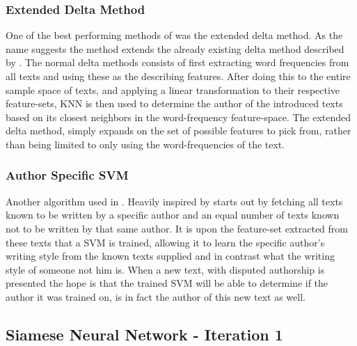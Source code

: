 \subsubsection{Extended Delta Method}

One of the best performing methods of \cite{US} was the extended delta method.
As the name suggests the method extends the already existing delta method
described by \cite{evert2015towards}. The normal delta methods consists of first
extracting word frequencies from all texts and using these as the describing
features. After doing this to the entire sample space of texts, and applying a
linear transformation to their respective feature-sets, \gls{KNN} is then used
to determine the author of the introduced texts based on its closest neighbors
in the word-frequency feature-space. The extended delta method, simply expands
on the set of possible features to pick from, rather than being limited to only
using the word-frequencies of the text.


\subsubsection{Author Specific SVM}

Another algorithm used in \cite{US}. Heavily inspired by \cite{hansen2014}
starts out by fetching all texts known to be written by a specific author and an
equal number of texts known not to be written by that same author. It is upon
the feature-set extracted from these texts that a \gls{SVM} is trained, allowing
it to learn the specific author's writing style from the known texts supplied
and in contrast what the writing style of someone not him is. When a new text,
with disputed authorship is presented the hope is that the trained \gls{SVM}
will be able to determine if the author it was trained on, is in fact the author
of this new text as well.


\subsection{Siamese Neural Network - Iteration 1}


